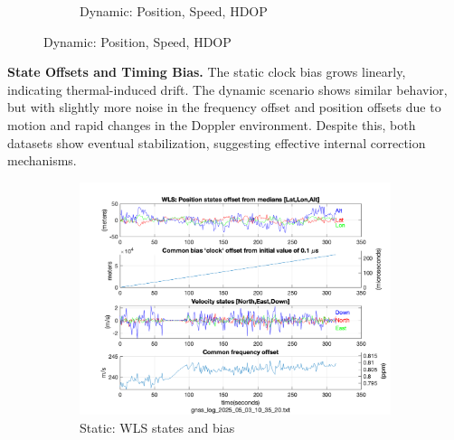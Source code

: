 \begin{figure}[h!]
\begin{subfigure}{0.23\textwidth}
                \caption{Dynamic: Position, Speed, HDOP}
            \end{subfigure}
        \end{figure}
    
        \vspace{0.5em}
        \textbf{State Offsets and Timing Bias.} 
        The static clock bias grows linearly, indicating thermal-induced drift. 
        The dynamic scenario shows similar behavior, but with slightly more noise in the frequency offset and position offsets due to motion and rapid changes in the Doppler environment. 
        Despite this, both datasets show eventual stabilization, suggesting effective internal correction mechanisms.
    
        \begin{figure}[h!]
            \centering
            \begin{subfigure}{0.23\textwidth}
                \includegraphics[width=\textwidth]{images/tests/Monte_Cappuccini/png/Samsung_A51_Monte_Cappuccini_fig5.png}
                \caption{Static: WLS states and bias}
            \end{subfigure}
            \hfill
            \begin{subfigure}{0.23\textwidth}

\end{subfigure}
\end{figure}
